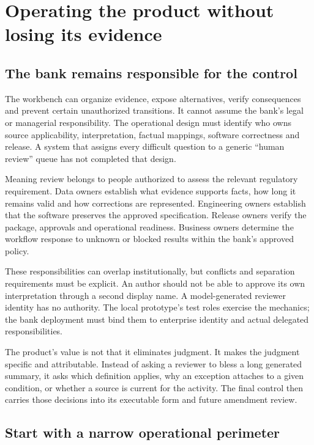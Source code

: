 \chapter{Operating the product without losing its evidence}
\label{ch:operation}

\section{The bank remains responsible for the control}

The workbench can organize evidence, expose alternatives, verify consequences and
prevent certain unauthorized transitions. It cannot assume the bank's legal or
managerial responsibility. The operational design must identify who owns source
applicability, interpretation, factual mappings, software correctness and release.
A system that assigns every difficult question to a generic ``human review'' queue
has not completed that design.

Meaning review belongs to people authorized to assess the relevant regulatory
requirement. Data owners establish what evidence supports facts, how long it
remains valid and how corrections are represented. Engineering owners establish
that the software preserves the approved specification. Release owners verify the
package, approvals and operational readiness. Business owners determine the
workflow response to unknown or blocked results within the bank's approved policy.

These responsibilities can overlap institutionally, but conflicts and separation
requirements must be explicit. An author should not be able to approve its own
interpretation through a second display name. A model-generated reviewer identity
has no authority. The local prototype's test roles exercise the mechanics; the
bank deployment must bind them to enterprise identity and actual delegated
responsibilities.

The product's value is not that it eliminates judgment. It makes the judgment
specific and attributable. Instead of asking a reviewer to bless a long generated
summary, it asks which definition applies, why an exception attaches to a given
condition, or whether a source is current for the activity. The final control
then carries those decisions into its executable form and future amendment review.

\section{Start with a narrow operational perimeter}

